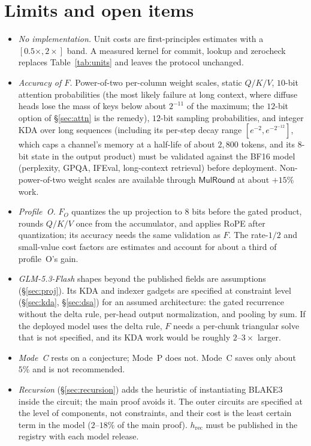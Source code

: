 \documentclass[11pt]{article}
\begin{document}
\section{Limits and open items}
\label{sec:limits}

\begin{itemize}
\item \emph{No implementation.} Unit costs are first-principles estimates with a \([0.5\times, 2\times]\) band. A measured kernel for commit, lookup and zerocheck replaces Table~\ref{tab:units} and leaves the protocol unchanged.
\item \emph{Accuracy of \(F\).} Power-of-two per-column weight scales, static \(Q/K/V\), \(10\)-bit attention probabilities (the most likely failure at long context, where diffuse heads lose the mass of keys below about \(2^{-11}\) of the maximum; the \(12\)-bit option of \S\ref{sec:attn} is the remedy), \(12\)-bit sampling probabilities, and integer KDA over long sequences (including its per-step decay range \([e^{-2}, e^{-2^{-12}}]\), which caps a channel's memory at a half-life of about \(2{,}800\) tokens, and its \(8\)-bit state in the output product) must be validated against the BF16 model (perplexity, GPQA, IFEval, long-context retrieval) before deployment. Non-power-of-two weight scales are available through \(\mathsf{MulRound}\) at about \(+15\%\) work.
\item \emph{Profile~O.} \(F_O\) quantizes the up projection to \(8\) bits before the gated product, rounds \(Q/K/V\) once from the accumulator, and applies RoPE after quantization; its accuracy needs the same validation as \(F\). The rate-\(1/2\) and small-value cost factors are estimates and account for about a third of profile~O's gain.
\item \emph{GLM-5.3-Flash} shapes beyond the published fields are assumptions (\S\ref{sec:proj}). Its KDA and indexer gadgets are specified at constraint level (\S\ref{sec:kda}, \S\ref{sec:dsa}) for an assumed architecture: the gated recurrence without the delta rule, per-head output normalization, and pooling by sum. If the deployed model uses the delta rule, \(F\) needs a per-chunk triangular solve that is not specified, and its KDA work would be roughly \(2\)--\(3\times\) larger.
\item \emph{Mode~C} rests on a conjecture; Mode~P does not. Mode~C saves only about \(5\%\) and is not recommended.
\item \emph{Recursion} (\S\ref{sec:recursion}) adds the heuristic of instantiating BLAKE3 inside the circuit; the main proof avoids it. The outer circuits are specified at the level of components, not constraints, and their cost is the least certain term in the model (\(2\)--\(18\%\) of the main proof). \(h_{\mathrm{rec}}\) must be published in the registry with each model release.

\end{itemize}
\end{document}

